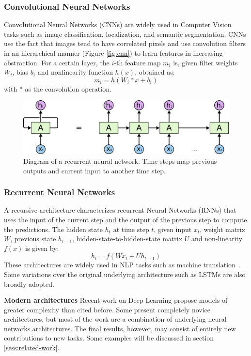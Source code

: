 \documentclass[12pt]{article}
\begin{document}
\subsubsection{Convolutional Neural Networks}
Convolutional Neural Networks (CNNs) are widely used in Computer Vision tasks such as image classification, localization, and semantic segmentation.
CNNs use the fact that images tend to have correlated pixels and use
convolution filters in an hierarchical manner (Figure \ref{fig:cnn})
to learn features in increasing abstraction.
For a certain layer, the $i$-th feature map $m_i$ is,
given filter weights $W_i$, bias $b_i$ and nonlinearity function $h(x)$,
obtained as:
$$m_i = h\left(W_i * x + b_i\right)$$
with $*$ as the convolution operation.

\begin{figure}
\begin{center}
    \includegraphics[width=0.9\linewidth]{./img/rnn2.png}
\caption{
    Diagram of a recurrent neural network.
    Time steps map previous outputs and current input to another time step.
}
\label{fig:rnn}
\end{center}
\end{figure}

\subsubsection{Recurrent Neural Networks}
A recursive architecture characterizes recurrent Neural Networks (RNNs)
that uses the input of the current step and the output of the previous
step to compute the predictions.
The hidden state $h_t$ at time step $t$, given input $x_t$, weight matrix $W$,
previous state $h_{t-1}$, hidden-state-to-hidden-state matrix $U$ and
non-linearity $f(x)$ is given by:
$$h_t = f\left(Wx_t + Uh_{t-1}\right)$$
These architectures are widely used in NLP tasks such as
machine translation~\cite{ref:rnn-nlp}.
Some variations over the original underlying architecture such as
LSTMs are also broadly adopted.

\textbf{Modern architectures}
Recent work on Deep Learning propose models of greater complexity than cited before.
Some present completely novice architectures, but most of the work are a combination of underlying neural networks architectures. The final results, however, may consist
of entirely new contributions to new tasks.
Some examples will be discussed in section \ref{sess:related-work}.
\end{document}
